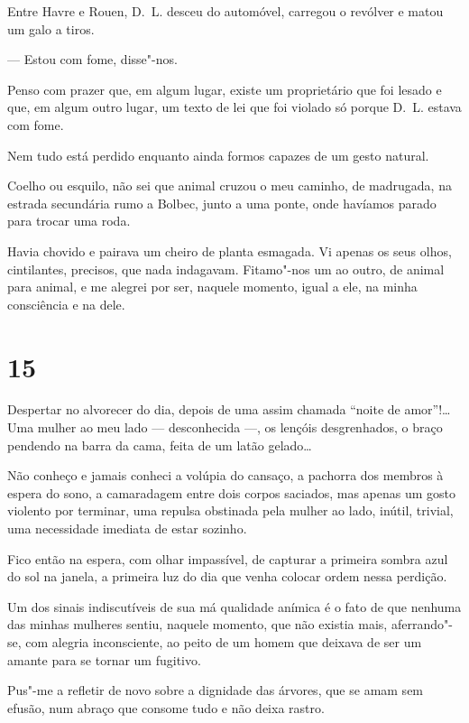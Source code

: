 \asterisc

Entre Havre e Rouen, D.~L. desceu do automóvel, carregou o revólver e
matou um galo a tiros.

--- Estou com fome, disse"-nos.

Penso com prazer que, em algum lugar, existe um proprietário que foi
lesado e que, em algum outro lugar, um texto de lei que foi violado só
porque D.~L. estava com fome.

Nem tudo está perdido enquanto ainda formos capazes de um gesto natural.

\asterisc

Coelho ou esquilo, não sei que animal cruzou o meu caminho, de
madrugada, na estrada secundária rumo a Bolbec, junto a uma ponte, onde
havíamos parado para trocar uma roda.

Havia chovido e pairava um cheiro de planta esmagada. Vi apenas os seus
olhos, cintilantes, precisos, que nada indagavam. Fitamo"-nos um ao
outro, de animal para animal, e me alegrei por ser, naquele momento,
igual a ele, na minha consciência e na dele.

\section{15}

Despertar no alvorecer do dia, depois de uma assim chamada ``noite de
amor''!\ldots{} Uma mulher ao meu lado --- desconhecida ---, os lençóis
desgrenhados, o braço pendendo na barra da cama, feita de um latão
gelado\ldots{}

Não conheço e jamais conheci a volúpia do cansaço, a pachorra dos
membros à espera do sono, a camaradagem entre dois corpos saciados, mas
apenas um gosto violento por terminar, uma repulsa obstinada pela mulher
ao lado, inútil, trivial, uma necessidade imediata de estar sozinho.

Fico então na espera, com olhar impassível, de capturar a primeira
sombra azul do sol na janela, a primeira luz do dia que venha colocar
ordem nessa perdição.

Um dos sinais indiscutíveis de sua má qualidade anímica é o fato de que
nenhuma das minhas mulheres sentiu, naquele momento, que não existia
mais, aferrando"-se, com alegria inconsciente, ao peito de um homem que
deixava de ser um amante para se tornar um fugitivo.

Pus"-me a refletir de novo sobre a dignidade das árvores, que se amam sem
efusão, num abraço que consome tudo e não deixa rastro.

